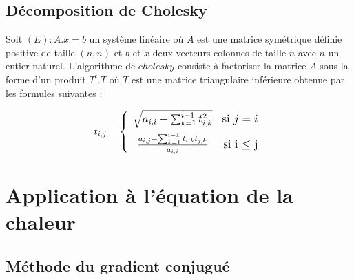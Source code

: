 \documentclass{article}
\begin{document}
\subsection{Décomposition de Cholesky}
Soit $(E) : A.x = b$ un système linéaire où $A$ est une matrice symétrique définie positive de taille $(n,n)$
et $b$ et $x$ deux vecteurs colonnes de taille $n$ avec $n$ un entier naturel.
L'algorithme de $cholesky$ consiste à factoriser la matrice $A$ sous la forme d’un produit $ T^{t}.T$ où $T$
est une matrice triangulaire inférieure obtenue par les formules suivantes :

\[ \large t_{i, j} = \left\{
    \begin{array}{cr}
        \rule{0pt}{2.5ex} \sqrt{ a_{i,i} - \sum_{k=1}^{i-1} t_{i,k}^{2}} & \mbox{si } j=i \\
        \rule{0pt}{4ex} \frac{ \LARGE a_{i,j} - \sum_{k=1}^{i-1} t_{i,k}t_{j,k} } {a_{i,i}}& \mbox{si i $\leq$ j}
    \end{array}
\right.\]



\section{Application à l'équation de la chaleur}
\subsection{Méthode du gradient conjugué}
\end{document}
